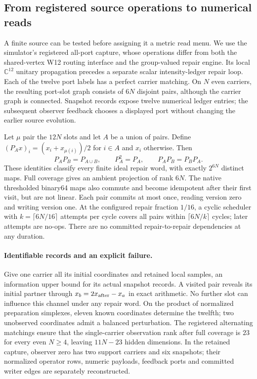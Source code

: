 \subsection{From registered source operations to numerical reads}
\label{sec:source-operation-reads}

A finite source can be tested before assigning it a metric read menu.
We use the simulator's registered all-port capture, whose operations differ
from both the shared-vertex W12 routing interface and the group-valued
repair engine. Its local $\mathbb C^{12}$ unitary propagation precedes a
separate scalar intensity-ledger repair loop. Each of the twelve port
labels has a perfect carrier matching. On $N$ even carriers, the resulting
port-slot graph consists of $6N$ disjoint pairs, although the carrier graph
is connected. Snapshot records expose twelve numerical ledger entries;
the subsequent observer feedback chooses a displayed port without changing
the earlier source evolution.

Let $\mu$ pair the $12N$ slots and let $A$ be a union of pairs. Define
$(P_Ax)_i=(x_i+x_{\mu(i)})/2$ for $i\in A$ and $x_i$ otherwise. Then
\[
 P_AP_B=P_{A\cup B},\qquad P_A^2=P_A,\qquad P_AP_B=P_BP_A.
\]
These identities classify every finite ideal repair word, with exactly
$2^{6N}$ distinct maps. Full coverage gives an ambient projection of rank
$6N$. The native thresholded binary64 maps also commute and become
idempotent after their first visit, but are not linear. Each pair commits
at most once, reading version zero and writing version one. At the configured repair fraction $1/16$, a cyclic
scheduler with $k=\lceil6N/16\rceil$ attempts per cycle covers all pairs
within $\lceil6N/k\rceil$ cycles; later attempts are no-ops. There are no
committed repair-to-repair dependencies at any duration.

\paragraph{Identifiable records and an explicit failure.}
Give one carrier all its initial coordinates and retained local samples,
an information upper bound for its actual snapshot records. A visited
pair reveals its initial partner through $x_b=2x_{\rm after}-x_a$ in exact
arithmetic. No further slot can influence this channel under any repair
word. On the product of normalized preparation simplexes, eleven known
coordinates determine the twelfth; two unobserved coordinates admit a
balanced perturbation. The registered alternating matchings ensure that
the single-carrier observation rank after full coverage is $23$ for every even
$N\geq4$, leaving $11N-23$ hidden dimensions. In the retained capture, observer zero has
two support carriers and six snapshots; their normalized operator rows,
numeric payloads, feedback ports and committed writer edges are separately
reconstructed.


